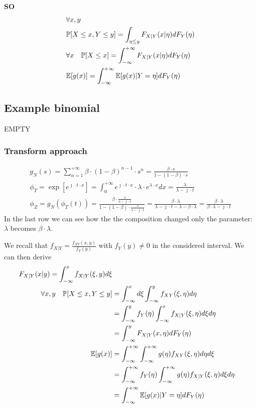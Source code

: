 \textbf{SO}
\begin{equation}
  \begin{split}
   &\forall x,y \\
  &\mathbb{P}[X\le x , Y \le y] = \int_{\eta \le y} F_{X|Y}(x|\eta) dF_Y(\eta)\\
  &\forall x \quad \mathbb{P}[X \le x] = \int_{-\infty}^{+\infty}F_{X|Y}(x|\eta) dF_Y(\eta) \\
  &\mathbb{E}[g(x)]=\int_{-\infty}^{+\infty}
  \mathbb{E}[g(x)|Y=\eta] dF_Y(\eta)
  \end{split}
\end{equation}

\subsection{Example binomial}
EMPTY

\subsubsection{Transform approach}
\begin{equation}
  \begin{split}
  g_N(s)=\sum \limits_{n=1}^{+\infty} \beta \cdot (1-\beta)^{n-1}\cdot s^n = \frac{\beta \cdot s}{1-(1-\beta)\cdot s}\\
  \phi_T=\exp[e^{\jmath \cdot t \cdot x}] = \int_{0}^{+\infty} e^{\jmath \cdot t \cdot x} \cdot \lambda \cdot e^{ \lambda \cdot x} dx = \frac{\lambda}{\lambda - \jmath \cdot t} \\
  \phi_Z = g_N(\phi_T(t))=\frac{\beta \cdot \frac{\lambda}{\lambda - \jmath \cdot t}}{1-(1-\beta)\cdot \frac{\lambda}{\lambda - \jmath \cdot t}} =
   \frac{\beta \cdot \lambda}{\lambda - \jmath \cdot t -\lambda - \beta \cdot \lambda} = \frac{\beta \cdot \lambda}{\beta \cdot \lambda - \jmath \cdot t}
  \end{split}
\end{equation}
In the last row we can see how the the composition changed only the parameter: $\lambda$ becomes $\beta \cdot \lambda$.

We recall that $f_{X|Y} = \frac{f_{XY}(x,y)}{f_Y(y)}$ with $f_Y(y)\neq 0$ in the considered interval.
We can then derive
\begin{equation}
  \begin{split}
  F_{X|Y}(x|y) = \int_{-\infty}^{x}f_{X|Y}(\xi,y)d\xi\\
  \forall x,y \quad \mathbb{P}[X \le x , Y \le y] &= \int_{-\infty}^{x}d\xi \int_{-\infty}^{y}f_{XY}(\xi,\eta) d\eta\\
  &=\int_{-\infty}^{y}f_Y(\eta) \int_{-\infty}^{x}f_{X|Y}(\xi,\eta) d\xi d\eta \\
  &=\int_{-\infty}^{y}F_{X|Y}(x,\eta) dF_Y(\eta)\\
  \mathbb{E}[g(x)] &= \int_{-\infty}^{+\infty} \int_{-\infty}^{+\infty}g(\eta) f_{XY}(\xi,\eta) d\eta  d\xi \\
  &= \int_{-\infty}^{+\infty} f_Y(\eta) \int_{-\infty}^{+\infty}g(\eta) f_{X|Y}(\xi,\eta)   d\xi d\eta \\
  &= \int_{-\infty}^{+\infty}\mathbb{E}[g(x)|Y=\eta] dF_Y(\eta)
  \end{split}
\end{equation}
